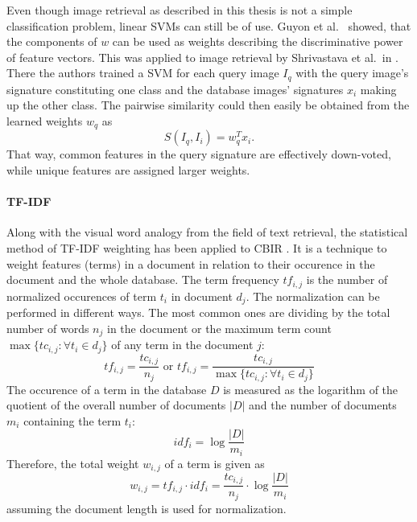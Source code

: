 Even though image retrieval as described in this thesis is not a simple
classification problem, linear SVMs can still be of use. Guyon et al.\
\autocite{guyon_gene_2002} showed, that the components of $w$ can be used as
weights describing the discriminative power of feature vectors. This was
applied to image retrieval by Shrivastava et al.\ in
\autocite{shrivastava_data-driven_2011}. There the authors trained a SVM for
each query image $I_q$ with the query image's signature constituting one class
and the database images' signatures $x_i$ making up the other class. The
pairwise similarity could then easily be obtained from the learned weights
$w_q$ as
\begin{equation*}
    S(I_q, I_i) = w_q^T x_i.
\end{equation*}
That way, common features in the query signature are effectively down-voted,
while unique features are assigned larger weights.

\paragraph{TF-IDF}

Along with the visual word analogy from the field of text retrieval, the
statistical method of TF-IDF weighting \autocite{baeza-yates_modern_1999} has
been applied to CBIR \autocite{sivic_video_2003}. It is a technique to weight
features (terms) in a document in relation to their occurence in the document
and the whole database. The term frequency $tf_{i, j}$ is the number of
normalized occurences of term $t_i$ in document $d_j$. The normalization can be
performed in different ways. The most common ones are dividing by the total
number of words $n_j$ in the document or the maximum term count $\max \{ tc_{i,
j} : \forall t_i \in d_j \}$ of any term in the document $j$:
\begin{equation*}
    tf_{i, j} = \frac{tc_{i, j}}{n_j} \text{ or } tf_{i, j} = \frac{tc_{i, j}}{\max \{ tc_{i, j} : \forall t_i \in d_j \}}
\end{equation*}
The occurence of a term in the database $D$ is measured as the logarithm of the
quotient of the overall number of documents $|D|$ and the number of documents
$m_i$ containing the term $t_i$:
\begin{equation*}
    idf_{i} = \log \frac{|D|}{m_i}
\end{equation*}
Therefore, the total weight $w_{i, j}$ of a term is given as
\begin{equation*}
    w_{i, j} = tf_{i, j} \cdot idf_{i} = \frac{tc_{i, j}}{n_j} \cdot \log \frac{|D|}{m_i}
\end{equation*}
assuming the document length is used for normalization.
